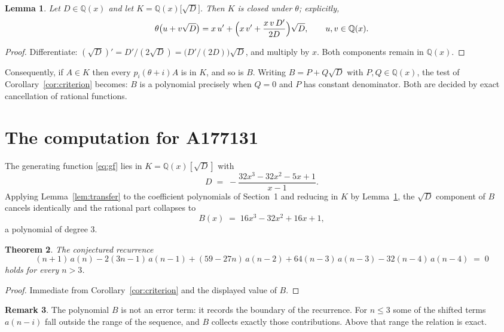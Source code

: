 \documentclass[11pt,a4paper]{article}
\theoremstyle{plain}
\newtheorem{theorem}{Theorem}
\newtheorem{lemma}[theorem]{Lemma}
\theoremstyle{definition}
\newtheorem{remark}[theorem]{Remark}
\begin{document}
\begin{lemma}\label{lem:field}
Let $D\in\mathbb{Q}(x)$ and let $K=\mathbb{Q}(x)\bigl[\sqrt{D}\bigr]$. Then $K$ is closed
under $\theta$; explicitly,
\[
\theta\bigl(u+v\sqrt{D}\bigr)=x\,u'+\Bigl(x\,v'+\frac{x\,v\,D'}{2D}\Bigr)\sqrt{D},
\qquad u,v\in\mathbb{Q}(x).
\]
\end{lemma}

\begin{proof}
Differentiate: $(\sqrt{D})'=D'/(2\sqrt{D})=\bigl(D'/(2D)\bigr)\sqrt{D}$, and multiply by
$x$. Both components remain in $\mathbb{Q}(x)$.
\end{proof}

Consequently, if $A\in K$ then every $p_{i}(\theta+i)A$ is in $K$, and so is $B$. Writing
$B=P+Q\sqrt{D}$ with $P,Q\in\mathbb{Q}(x)$, the test of Corollary~\ref{cor:criterion}
becomes: $B$ is a polynomial precisely when $Q=0$ and $P$ has constant denominator. Both
are decided by exact cancellation of rational functions.

\section{The computation for A177131}

The generating function \eqref{eq:gf} lies in $K=\mathbb{Q}(x)[\sqrt{D}]$ with
\[
D \;=\; - \frac{32 x^{3} - 32 x^{2} - 5 x + 1}{x - 1} .
\]
Applying Lemma~\ref{lem:transfer} to the coefficient polynomials of Section~1 and reducing
in $K$ by Lemma~\ref{lem:field}, the $\sqrt{D}$ component of $B$ cancels identically and
the rational part collapses to
\[
B(x)\;=\;16 x^{3} - 32 x^{2} + 16 x + 1 ,
\]
a polynomial of degree $3$.

\begin{theorem}
The conjectured recurrence
\[
(n + 1)\,a(n) -  2 \left(3 n - 1\right)\,a(n-1) + (59 - 27 n)\,a(n-2) + 64 \left(n - 3\right)\,a(n-3) -  32 \left(n - 4\right)\,a(n-4) \;=\;0
\]
holds for every $n>3$.
\end{theorem}

\begin{proof}
Immediate from Corollary~\ref{cor:criterion} and the displayed value of $B$.
\end{proof}

\begin{remark}
The polynomial $B$ is not an error term: it records the boundary of the recurrence. For
$n\le3$ some of the shifted terms $a(n-i)$ fall outside the range of the sequence,
and $B$ collects exactly those contributions. Above that range the relation is exact.
\end{remark}
\end{document}
